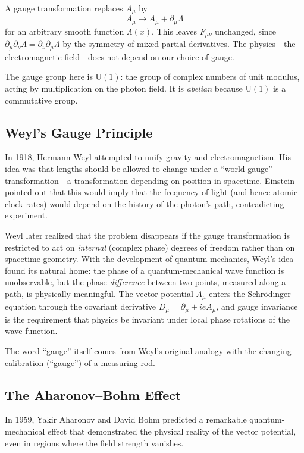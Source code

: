 A gauge transformation replaces $A_\mu$ by
\[
A_\mu \to A_\mu + \partial_\mu \Lambda
\]
for an arbitrary smooth function $\Lambda(x)$. This leaves $F_{\mu\nu}$ unchanged, since $\partial_\mu \partial_\nu \Lambda = \partial_\nu \partial_\mu \Lambda$ by the symmetry of mixed partial derivatives. The physics---the electromagnetic field---does not depend on our choice of gauge.

The gauge group here is $\mathrm{U}(1)$: the group of complex numbers of unit modulus, acting by multiplication on the photon field. It is \textit{abelian} because $\mathrm{U}(1)$ is a commutative group.

\subsection{Weyl's Gauge Principle}

In 1918, Hermann Weyl attempted to unify gravity and electromagnetism. His idea was that lengths should be allowed to change under a ``world gauge'' transformation---a transformation depending on position in spacetime. Einstein pointed out that this would imply that the frequency of light (and hence atomic clock rates) would depend on the history of the photon's path, contradicting experiment.

Weyl later realized that the problem disappears if the gauge transformation is restricted to act on \textit{internal} (complex phase) degrees of freedom rather than on spacetime geometry. With the development of quantum mechanics, Weyl's idea found its natural home: the phase of a quantum-mechanical wave function is unobservable, but the phase \textit{difference} between two points, measured along a path, is physically meaningful. The vector potential $A_\mu$ enters the Schr\"{o}dinger equation through the covariant derivative $D_\mu = \partial_\mu + ieA_\mu$, and gauge invariance is the requirement that physics be invariant under local phase rotations of the wave function.

The word ``gauge'' itself comes from Weyl's original analogy with the changing calibration (``gauge'') of a measuring rod.

\subsection{The Aharonov--Bohm Effect}

In 1959, Yakir Aharonov and David Bohm predicted a remarkable quantum-mechanical effect that demonstrated the physical reality of the vector potential, even in regions where the field strength vanishes.

